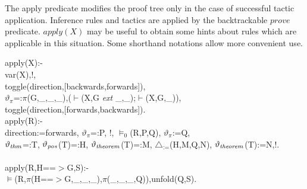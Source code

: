 \documentclass[11pt]{report}
\makeatletter
\newcommand{\ulinv}[1]{\index{#1@\texttt{#1}}}
\makeatother
\begin{document}
 The apply predicate modifies the proof tree
 only in the case of successful tactic application. 
 Inference rules and tactics are applied by the backtrackable
 $prove$ predicate. $apply(X)$ may be useful to obtain some
 hints about rules which are applicable in this situation.
 Some shorthand notations allow more convenient use.
 \ulinv{apply}
\begin{sf}\begin{tabbing}
apply(X):-\\[-0.15ex]
\hspace{2em}var(X),!,\\[-0.15ex]
\hspace{2em}toggle(direction,[backwards,forwards]),\\[-0.15ex]
\hspace{2em}$\vartheta_{\pi}$=:$\pi$(G,\_\hspace{0.1em},\_\hspace{0.1em},\_\hspace{0.1em}),($\vdash$(X,G \mbox{\it ext} \_\hspace{0.1em},\_\hspace{0.1em});$\vdash$(X,G,\_\hspace{0.1em})),\\[-0.15ex]
\hspace{2em}toggle(direction,[forwards,backwards]).\\[-0.15ex]
apply(R):-\\[-0.15ex]
\hspace{2em}direction:=forwards, $\vartheta_{\pi}$=:P, !, $\models_{0}$(R,P,Q), $\vartheta_{\pi}$:=Q, \\[-0.15ex]
\hspace{2em}$\vartheta_{\it thm}$=:T, $\vartheta_{\it pos}$(T)=:H, $\vartheta_{\it theorem}$(T)=:M, $\triangle_{:=}$(H,M,Q,N), $\vartheta_{\it theorem}$(T):=N,!.\\[-0.7ex]
\\[-0.15ex]
apply(R,H==$>$G,S):-\\[-0.15ex]
\hspace{2em}$\models$(R,$\pi$(H==$>$G,\_\hspace{0.1em},\_\hspace{0.1em},\_\hspace{0.1em}),$\pi$(\_\hspace{0.1em},\_\hspace{0.1em},\_\hspace{0.1em},Q)),unfold(Q,S).\\[-0.7ex]

\end{tabbing}\end{sf}
\end{document}
